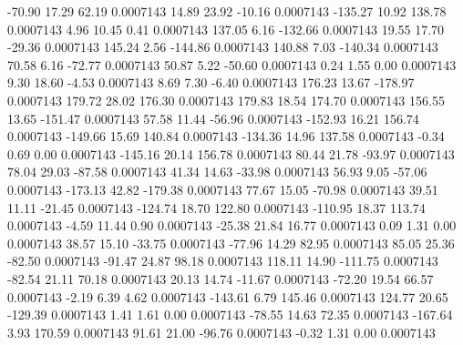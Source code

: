       -70.90       17.29       62.19     0.0007143
       14.89       23.92      -10.16     0.0007143
     -135.27       10.92      138.78     0.0007143
        4.96       10.45        0.41     0.0007143
      137.05        6.16     -132.66     0.0007143
       19.55       17.70      -29.36     0.0007143
      145.24        2.56     -144.86     0.0007143
      140.88        7.03     -140.34     0.0007143
       70.58        6.16      -72.77     0.0007143
       50.87        5.22      -50.60     0.0007143
        0.24        1.55        0.00     0.0007143
        9.30       18.60       -4.53     0.0007143
        8.69        7.30       -6.40     0.0007143
      176.23       13.67     -178.97     0.0007143
      179.72       28.02      176.30     0.0007143
      179.83       18.54      174.70     0.0007143
      156.55       13.65     -151.47     0.0007143
       57.58       11.44      -56.96     0.0007143
     -152.93       16.21      156.74     0.0007143
     -149.66       15.69      140.84     0.0007143
     -134.36       14.96      137.58     0.0007143
       -0.34        0.69        0.00     0.0007143
     -145.16       20.14      156.78     0.0007143
       80.44       21.78      -93.97     0.0007143
       78.04       29.03      -87.58     0.0007143
       41.34       14.63      -33.98     0.0007143
       56.93        9.05      -57.06     0.0007143
     -173.13       42.82     -179.38     0.0007143
       77.67       15.05      -70.98     0.0007143
       39.51       11.11      -21.45     0.0007143
     -124.74       18.70      122.80     0.0007143
     -110.95       18.37      113.74     0.0007143
       -4.59       11.44        0.90     0.0007143
      -25.38       21.84       16.77     0.0007143
        0.09        1.31        0.00     0.0007143
       38.57       15.10      -33.75     0.0007143
      -77.96       14.29       82.95     0.0007143
       85.05       25.36      -82.50     0.0007143
      -91.47       24.87       98.18     0.0007143
      118.11       14.90     -111.75     0.0007143
      -82.54       21.11       70.18     0.0007143
       20.13       14.74      -11.67     0.0007143
      -72.20       19.54       66.57     0.0007143
       -2.19        6.39        4.62     0.0007143
     -143.61        6.79      145.46     0.0007143
      124.77       20.65     -129.39     0.0007143
        1.41        1.61        0.00     0.0007143
      -78.55       14.63       72.35     0.0007143
     -167.64        3.93      170.59     0.0007143
       91.61       21.00      -96.76     0.0007143
       -0.32        1.31        0.00     0.0007143

